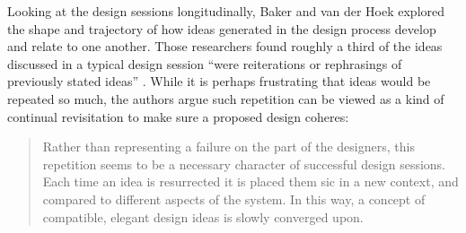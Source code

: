 Looking at the design sessions longitudinally, Baker and van der Hoek \cite{baker_ideas_2010} explored the shape and trajectory of how ideas generated in the design process develop and relate to one another. Those researchers found roughly a third of the ideas discussed in a typical design session ``were reiterations or rephrasings of previously stated ideas'' \cite{baker_ideas_2010}. While it is perhaps frustrating that ideas would be repeated so much, the authors argue such repetition can be viewed as a kind of continual revisitation to make sure a proposed design coheres:

\begin{quote}
Rather than representing a failure on the part of the designers, this repetition seems to be a necessary character of successful design sessions. Each time an idea is resurrected it is placed them sic in a new context, and compared to different aspects of the system. In this way, a concept of compatible, elegant design ideas is slowly converged upon. \cite{baker_ideas_2010}
\end{quote}
